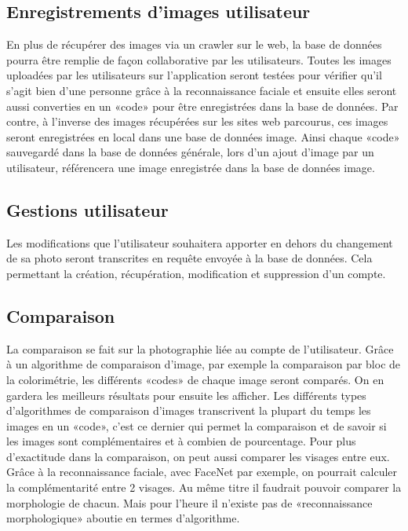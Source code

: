 \documentclass[a4paper,12pt]{article}
\begin{document}
 \subsection{Enregistrements d'images utilisateur}
 En plus de récupérer des images via un crawler sur le web, la base de données pourra être remplie de façon collaborative par les utilisateurs. Toutes les images uploadées par les utilisateurs sur l'application seront testées pour vérifier qu'il s'agit bien d'une personne grâce à la reconnaissance faciale et ensuite elles seront aussi converties en un «code» pour être enregistrées dans la base de données. Par contre, à l'inverse des images récupérées sur les sites web parcourus, ces images seront enregistrées en local dans une base de données image. Ainsi chaque «code» sauvegardé dans la base de données générale, lors d'un ajout d'image par un utilisateur, référencera une image enregistrée dans la base de données image. 
 \subsection{Gestions utilisateur}
 Les modifications que l'utilisateur souhaitera apporter en dehors du changement de sa photo seront transcrites en requête envoyée à la base de données.  Cela permettant la création, récupération, modification et suppression d'un compte. 
 \subsection{Comparaison}
 La comparaison se fait sur la photographie liée au compte de l'utilisateur. Grâce à un algorithme de comparaison d'image, par exemple la comparaison par bloc de la colorimétrie, les différents «codes» de chaque image seront comparés. On en gardera les meilleurs résultats pour ensuite les afficher. Les différents types d'algorithmes de comparaison d'images transcrivent la plupart du temps les images en un «code», c'est ce dernier qui permet la comparaison et de savoir si les images sont complémentaires et à combien de pourcentage. Pour plus d'exactitude dans la comparaison, on peut aussi comparer les visages entre eux. Grâce à la reconnaissance faciale, avec FaceNet par exemple, on pourrait calculer la complémentarité entre 2 visages. Au même titre il faudrait pouvoir comparer la morphologie de chacun. Mais pour l'heure il n'existe pas de «reconnaissance morphologique» aboutie en termes d'algorithme. 
\end{document}
